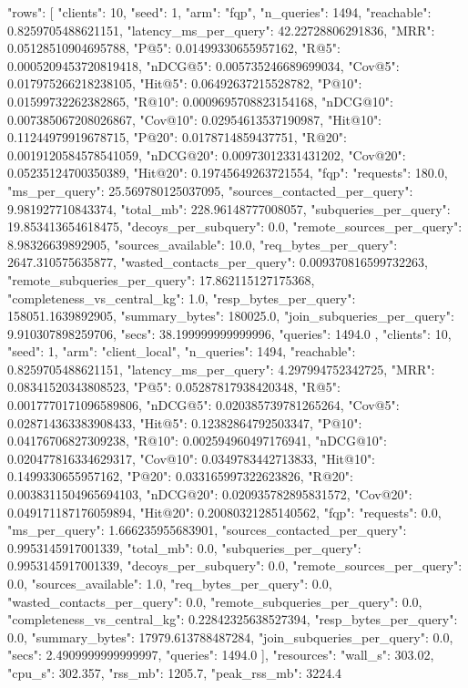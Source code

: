 {
 "rows": [
  {
   "clients": 10,
   "seed": 1,
   "arm": "fqp",
   "n_queries": 1494,
   "reachable": 0.8259705488621151,
   "latency_ms_per_query": 42.22728806291836,
   "MRR": 0.05128510904695788,
   "P@5": 0.01499330655957162,
   "R@5": 0.0005209453720819418,
   "nDCG@5": 0.005735246689699034,
   "Cov@5": 0.017975266218238105,
   "Hit@5": 0.06492637215528782,
   "P@10": 0.01599732262382865,
   "R@10": 0.0009695708823154168,
   "nDCG@10": 0.007385067208026867,
   "Cov@10": 0.02954613537190987,
   "Hit@10": 0.11244979919678715,
   "P@20": 0.0178714859437751,
   "R@20": 0.0019120584578541059,
   "nDCG@20": 0.00973012331431202,
   "Cov@20": 0.05235124700350389,
   "Hit@20": 0.19745649263721554,
   "fqp": {
    "requests": 180.0,
    "ms_per_query": 25.569780125037095,
    "sources_contacted_per_query": 9.981927710843374,
    "total_mb": 228.96148777008057,
    "subqueries_per_query": 19.853413654618475,
    "decoys_per_subquery": 0.0,
    "remote_sources_per_query": 8.98326639892905,
    "sources_available": 10.0,
    "req_bytes_per_query": 2647.310575635877,
    "wasted_contacts_per_query": 0.009370816599732263,
    "remote_subqueries_per_query": 17.862115127175368,
    "completeness_vs_central_kg": 1.0,
    "resp_bytes_per_query": 158051.1639892905,
    "summary_bytes": 180025.0,
    "join_subqueries_per_query": 9.910307898259706,
    "secs": 38.199999999999996,
    "queries": 1494.0
   }
  },
  {
   "clients": 10,
   "seed": 1,
   "arm": "client_local",
   "n_queries": 1494,
   "reachable": 0.8259705488621151,
   "latency_ms_per_query": 4.297994752342725,
   "MRR": 0.08341520343808523,
   "P@5": 0.05287817938420348,
   "R@5": 0.0017770171096589806,
   "nDCG@5": 0.020385739781265264,
   "Cov@5": 0.028714363383908433,
   "Hit@5": 0.12382864792503347,
   "P@10": 0.04176706827309238,
   "R@10": 0.002594960497176941,
   "nDCG@10": 0.020477816334629317,
   "Cov@10": 0.0349783442713833,
   "Hit@10": 0.1499330655957162,
   "P@20": 0.033165997322623826,
   "R@20": 0.0038311504965694103,
   "nDCG@20": 0.020935782895831572,
   "Cov@20": 0.049171187176059894,
   "Hit@20": 0.20080321285140562,
   "fqp": {
    "requests": 0.0,
    "ms_per_query": 1.666235955683901,
    "sources_contacted_per_query": 0.9953145917001339,
    "total_mb": 0.0,
    "subqueries_per_query": 0.9953145917001339,
    "decoys_per_subquery": 0.0,
    "remote_sources_per_query": 0.0,
    "sources_available": 1.0,
    "req_bytes_per_query": 0.0,
    "wasted_contacts_per_query": 0.0,
    "remote_subqueries_per_query": 0.0,
    "completeness_vs_central_kg": 0.22842325638527394,
    "resp_bytes_per_query": 0.0,
    "summary_bytes": 17979.613788487284,
    "join_subqueries_per_query": 0.0,
    "secs": 2.4909999999999997,
    "queries": 1494.0
   }
  }
 ],
 "resources": {
  "wall_s": 303.02,
  "cpu_s": 302.357,
  "rss_mb": 1205.7,
  "peak_rss_mb": 3224.4
 }
}